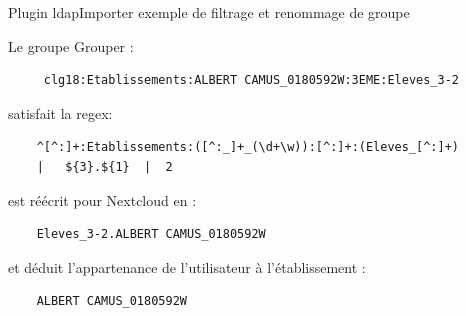 \begin{frame}[fragile]{Plugin ldapImporter} %
{exemple de filtrage et renommage de groupe}
\begin{list}{}{}
	\item {\tiny Le groupe Grouper :}
\begin{verbatim}
     clg18:Etablissements:ALBERT CAMUS_0180592W:3EME:Eleves_3-2
\end{verbatim}
\item {\tiny satisfait la regex:}
\begin{verbatim}
    ^[^:]+:Etablissements:([^:_]+_(\d+\w)):[^:]+:(Eleves_[^:]+) 
    |   ${3}.${1}  |  2
\end{verbatim}
\item {\tiny est réécrit pour Nextcloud en :}
\begin{verbatim}
    Eleves_3-2.ALBERT CAMUS_0180592W
\end{verbatim}
\item {\tiny et déduit l’appartenance de l'utilisateur à l'établissement :}
\begin{verbatim}
    ALBERT CAMUS_0180592W
\end{verbatim}
\end{list}
\end{frame}



